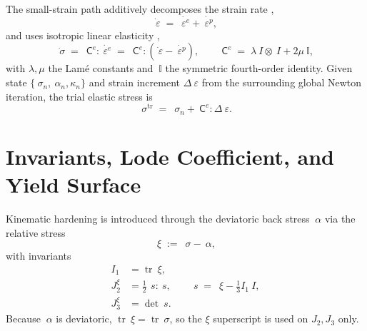 \documentclass[12pt]{article}
\DeclareMathOperator{\trace}{tr}
\newcommand{\stress}{~\sigma}
\newcommand{\backstress}{~\alpha}
\newcommand{\relstress}{~\xi}
\newcommand{\estrain}{{~\varepsilon^e}}
\newcommand{\pstrain}{{~\varepsilon^p}}
\newcommand{\strainincr}{\Delta~\varepsilon}
\newcommand{\Celast}{{~{\mathsf C}^e}}
\newcommand{\sdev}{~s}
\begin{document}
The small-strain path additively decomposes the strain rate
\citep[Eq.~47]{Sun.Chen.Ostien:2014},
\begin{equation}
  \dot{~\varepsilon} \;=\; \dot{\estrain} + \dot{\pstrain},
\end{equation}
and uses isotropic linear elasticity
\citep[Eqs.~49--50]{Sun.Chen.Ostien:2014},
\begin{equation}
  \dot{\stress} \;=\; \Celast : \dot{\estrain}
    \;=\; \Celast : (\dot{~\varepsilon} - \dot{\pstrain}),
  \qquad
  \Celast \;=\; \lambda~I \otimes ~I + 2\mu ~{\mathbb I},
\end{equation}
with $\lambda,\mu$ the Lam\'e constants and $~{\mathbb I}$ the
symmetric fourth-order identity. Given state
$\{\stress_n, \backstress_n, \kappa_n\}$ and strain increment
$\strainincr$ from the surrounding global Newton iteration, the trial
elastic stress is
\begin{equation}
  \stress^{\mathrm{tr}} \;=\; \stress_n + \Celast : \strainincr .
  \label{eq:trial_small}
\end{equation}

\section{Invariants, Lode Coefficient, and Yield Surface}
\label{sec:yield}

Kinematic hardening is introduced through the deviatoric back stress
$\backstress$ via the relative stress
\begin{equation}
  \relstress \;:=\; \stress - \backstress,
\end{equation}
with invariants
\begin{align}
  I_1        &= \trace \relstress, \\
  J_2^{\xi}  &= \tfrac{1}{2}\, \sdev : \sdev,
                \qquad \sdev \;=\; \relstress - \tfrac{1}{3} I_1 ~I, \\
  J_3^{\xi}  &= \det \sdev .
\end{align}
Because $\backstress$ is deviatoric,
$\trace\relstress = \trace\stress$, so the $\xi$ superscript is used
on $J_2, J_3$ only.
\end{document}
